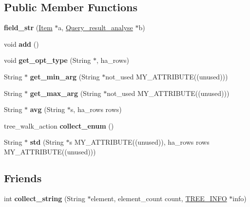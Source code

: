 \subsection*{Public Member Functions}
\begin{DoxyCompactItemize}
\item 
\mbox{\label{classfield__str_a29cb1173c706edbe5301f4064f528242}} 
{\bfseries field\+\_\+str} (\mbox{\hyperlink{classItem}{Item}} $\ast$a, \mbox{\hyperlink{classQuery__result__analyse}{Query\+\_\+result\+\_\+analyse}} $\ast$b)
\item 
\mbox{\label{classfield__str_a9d7074ce18d503c98a4853f931893fe5}} 
void {\bfseries add} ()
\item 
\mbox{\label{classfield__str_a873bb410f8cda6d494bf6d4304a462cd}} 
void {\bfseries get\+\_\+opt\+\_\+type} (String $\ast$, ha\+\_\+rows)
\item 
\mbox{\label{classfield__str_aefafbdfbd8e58be714c7dca753738f7a}} 
String $\ast$ {\bfseries get\+\_\+min\+\_\+arg} (String $\ast$not\+\_\+used M\+Y\+\_\+\+A\+T\+T\+R\+I\+B\+U\+TE((unused)))
\item 
\mbox{\label{classfield__str_a9b3a776297aecab3cc28e50d6ef0dce3}} 
String $\ast$ {\bfseries get\+\_\+max\+\_\+arg} (String $\ast$not\+\_\+used M\+Y\+\_\+\+A\+T\+T\+R\+I\+B\+U\+TE((unused)))
\item 
\mbox{\label{classfield__str_a8ab27ad4c09e920a18bde17703594e96}} 
String $\ast$ {\bfseries avg} (String $\ast$s, ha\+\_\+rows rows)
\item 
\mbox{\label{classfield__str_a60bf4c1dd24392e669d332cb9ace6d28}} 
tree\+\_\+walk\+\_\+action {\bfseries collect\+\_\+enum} ()
\item 
\mbox{\label{classfield__str_a7e1238067b2df51a0dd80ed75317e2a7}} 
String $\ast$ {\bfseries std} (String $\ast$s M\+Y\+\_\+\+A\+T\+T\+R\+I\+B\+U\+TE((unused)), ha\+\_\+rows rows M\+Y\+\_\+\+A\+T\+T\+R\+I\+B\+U\+TE((unused)))
\end{DoxyCompactItemize}
\subsection*{Friends}
\begin{DoxyCompactItemize}
\item 
\mbox{\label{classfield__str_a4117999e1523cffc14cdc74a34cb4c53}} 
int {\bfseries collect\+\_\+string} (String $\ast$element, element\+\_\+count count, \mbox{\hyperlink{structst__tree__info}{T\+R\+E\+E\+\_\+\+I\+N\+FO}} $\ast$info)
\end{DoxyCompactItemize}
